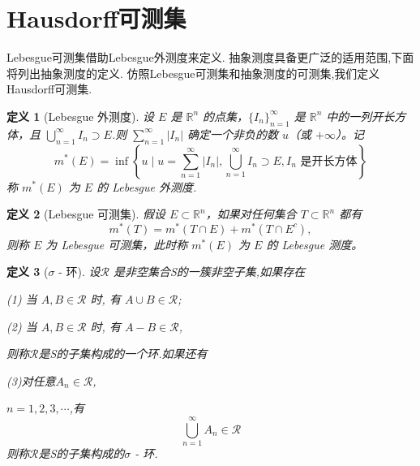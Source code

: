 \documentclass[hyperref,a4paper,UTF8]{ctexart}
\newtheorem{definition}{定义}[section]
\begin{document}






\section{Hausdorff可测集}

Lebesgue可测集借助Lebesgue外测度来定义. 
抽象测度具备更广泛的适用范围,下面将列出抽象测度的定义.
仿照Lebesgue可测集和抽象测度的可测集,我们定义Hausdorff可测集.

\begin{definition}[Lebesgue 外测度]

  设 $E$ 是 $\mathbb{R}^n$ 的点集，$\{I_n\}_{n=1}^{\infty}$ 是 $\mathbb{R}^n$ 中的一列开长方体，且 $\bigcup\limits_{n=1}^{\infty} I_n \supset E$.则 $\sum\limits_{n=1}^{\infty} |I_n|$ 确定一个非负的数 $u$（或 $+\infty$）。记
  \[ 
  m^*(E) = \inf \left\{ u \mid u = \sum_{n=1}^{\infty} |I_n| , \bigcup_{n=1}^{\infty} I_n \supset E, I_n \text{ 是开长方体} \right\} 
  \]
  称 $m^*(E)$ 为 $E$ 的 Lebesgue 外测度.
\end{definition}

\begin{definition}[Lebesgue 可测集]

  假设 \( E \subset \mathbb{R}^n \)，如果对任何集合 \( T \subset \mathbb{R}^n \) 都有
  \[ 
  m^*(T) = m^*(T \cap E) + m^*(T \cap E^c), 
  \]
  则称 \( E \) 为 Lebesgue 可测集，此时称 \( m^*(E) \) 为 \( E \) 的 Lebesgue 测度。
\end{definition}

\begin{definition}[$\sigma$ - 环]

  设$\mathscr{R}$ 是非空集合S的一簇非空子集,如果存在

  (1) 当 $A,B\in \mathscr{R}$ 时, 有 $A \cup B \in \mathscr{R}$;

  (2) 当 $A,B\in \mathscr{R}$ 时, 有 $A - B \in \mathscr{R}$,

  则称$\mathscr{R}$是S的子集构成的一个环.如果还有

  (3)对任意$A_n \in \mathscr{R}$,

  $n = 1,2,3,\cdots$,有
  \[
  \bigcup_{n=1}^{\infty} A_n \in \mathscr{R}
  \]
  则称$\mathscr{R}$是S的子集构成的$\sigma$ - 环.

\end{definition}
\end{document}
